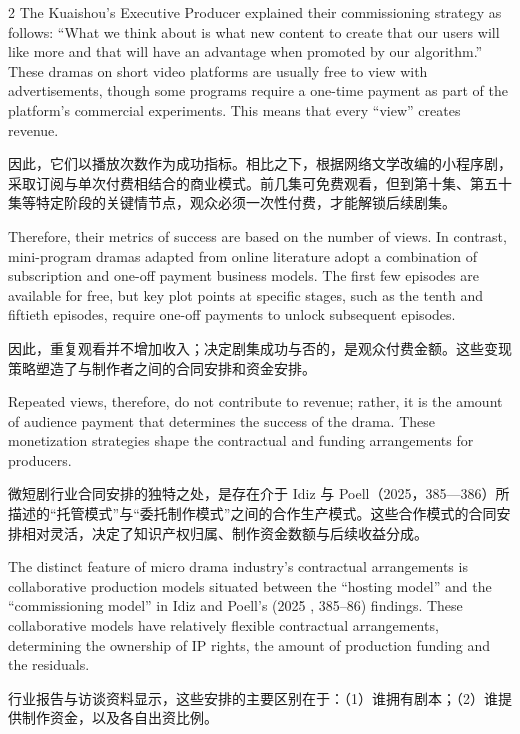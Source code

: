 \documentclass[10pt,a4paper]{article}
\begin{document}
\begin{paracol}{2}
\switchcolumn
The Kuaishou’s Executive Producer explained their commissioning strategy as follows: “What we think about is what new content to create that our users will like more and that will have an advantage when promoted by our algorithm.” These dramas on short video platforms are usually free to view with advertisements, though some programs require a one-time payment as part of the platform’s commercial experiments. This means that every “view” creates revenue.\par
\switchcolumn*
因此，它们以播放次数作为成功指标。相比之下，根据网络文学改编的小程序剧，采取订阅与单次付费相结合的商业模式。前几集可免费观看，但到第十集、第五十集等特定阶段的关键情节点，观众必须一次性付费，才能解锁后续剧集。\par
\switchcolumn
Therefore, their metrics of success are based on the number of views. In contrast, mini-program dramas adapted from online literature adopt a combination of subscription and one-off payment business models. The first few episodes are available for free, but key plot points at specific stages, such as the tenth and fiftieth episodes, require one-off payments to unlock subsequent episodes.\par
\switchcolumn*
因此，重复观看并不增加收入；决定剧集成功与否的，是观众付费金额。这些变现策略塑造了与制作者之间的合同安排和资金安排。\par
\switchcolumn
Repeated views, therefore, do not contribute to revenue; rather, it is the amount of audience payment that determines the success of the drama. These monetization strategies shape the contractual and funding arrangements for producers.\par
\switchcolumn*
微短剧行业合同安排的独特之处，是存在介于 Idiz 与 Poell（2025，385—386）所描述的“托管模式”与“委托制作模式”之间的合作生产模式。这些合作模式的合同安排相对灵活，决定了知识产权归属、制作资金数额与后续收益分成。\par
\switchcolumn
The distinct feature of micro drama industry’s contractual arrangements is collaborative production models situated between the “hosting model” and the “commissioning model” in Idiz and Poell’s (2025 , 385–86) findings. These collaborative models have relatively flexible contractual arrangements, determining the ownership of IP rights, the amount of production funding and the residuals.\par
\switchcolumn*
行业报告与访谈资料显示，这些安排的主要区别在于：（1）谁拥有剧本；（2）谁提供制作资金，以及各自出资比例。\par

\end{paracol}
\end{document}
